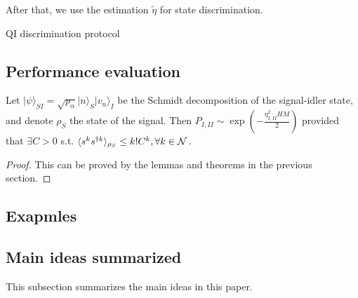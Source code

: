 \documentclass[../../note.tex]{subfiles}
\begin{document}
After that, we use the estimation $\tilde{\eta}$ for state discrimination.


\begin{algorithm}[H]
    \caption{QI discrimination protocol}
    \label{ptl: quantum illumination discrimination protocol}
\end{algorithm}

\subsection{Performance evaluation}
\begin{theorem}
    Let $\vert \psi \rangle_{SI} = \sqrt{p_\alpha}\vert n \rangle_S \vert v_n \rangle_I$ be the Schmidt decomposition of the signal-idler state, and denote $\rho_S$ the state of the signal. Then $P_{I, II} \sim \exp\left(-\frac{\eta_{I, II}^2 H M}{2}\right)$ provided that $\exists C >0$ s.t. $\langle s^k s^{\dagger k} \rangle_{\rho_S} \leq k !C^k, \forall k \in \mathcal{N}$.
\end{theorem}
\begin{proof}
    This can be proved by the lemmas and theorems in the previous section.
\end{proof}

\subsection{Exapmles}
\begin{example}
 
\end{example}

\begin{example}
 
\end{example}

\subsection{Main ideas summarized}
This subsection summarizes the main ideas in this paper.
\end{document}
